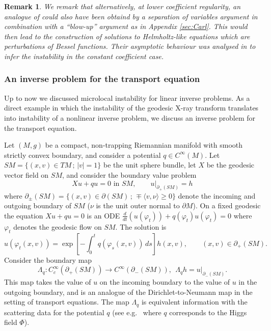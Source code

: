 \documentclass[12pt,twoside]{amsart}
\numberwithin{equation}{section}
\renewcommand{\geq}{\geqslant}
\newtheorem{remark}[theorem]{Remark}
\begin{document}
\begin{remark} \label{rmk:alternative}
We remark that alternatively, at lower coefficient regularity, an analogue of \cite{John} could also have been obtaind by a separation of variables argument in combination with a ``blow-up'' argument as in Appendix \ref{sec:Carl}. This would then lead to the construction of solutions to Helmholtz-like equations which are perturbations of Bessel functions. Their asymptotic behaviour was analysed in \cite{John} to infer the instability in the constant coefficient case.
\end{remark}




\subsubsection{An inverse problem for the transport equation}

Up to now we discussed microlocal instability for linear inverse problems. As a direct example in which the instability of the geodesic X-ray transform translates into instability of a nonlinear inverse problem, we discuss an inverse problem for the transport equation.

Let $(M,g)$ be a compact, non-trapping Riemannian manifold with smooth strictly convex boundary, and consider a potential $q \in C^{\infty}(M)$. Let $SM = \{ (x,v) \in TM \,;\, |v| = 1 \}$ be the unit sphere bundle, let $X$ be the geodesic vector field on $SM$, and consider the boundary value problem 
\[
Xu + qu = 0 \text{ in $SM$}, \qquad u|_{\partial_+(SM)} = h
\]
where $\partial_{\pm}(SM) = \{ (x,v) \in \partial(SM) \,;\, \mp \langle v, \nu \rangle \geq 0 \}$ denote the incoming and outgoing boundary of $SM$ ($\nu$ is the unit outer normal to $\partial M$). On a fixed geodesic the equation $Xu + qu=0$ is an ODE $\frac{d}{dt} (u(\varphi_t)) + q(\varphi_t) u(\varphi_t) = 0$ where $\varphi_t$ denotes the geodesic flow on $SM$. The solution is 
\[
u(\varphi_t(x,v)) = \exp \left[ -\int_0^t q(\varphi_s(x,v)) \,ds \right] h(x,v), \qquad (x,v) \in \partial_+(SM).
\]
Consider the boundary map 
\[
\Lambda_q: C^{\infty}_c(\partial_+(SM)) \to C^{\infty}(\partial_-(SM)), \ \ \Lambda_q h = u|_{\partial_-(SM)}.
\]
This map takes the value of $u$ on the incoming boundary to the value of $u$ in the outgoing boundary, and is an analogue of the Dirichlet-to-Neumann map in the setting of transport equations. The map $\Lambda_q$ is equivalent information with the scattering data for the potential $q$ (see e.g.\ \cite{PSU_GAFA} where $q$ corresponds to the Higgs field $\Phi$).
\end{document}
